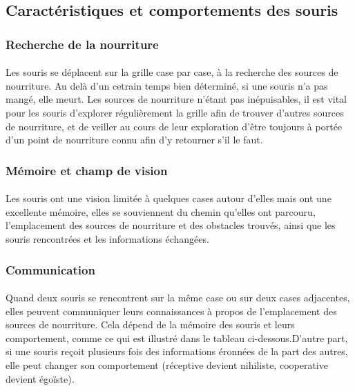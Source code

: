\subsection{Caractéristiques et comportements des souris}
\label{sec:caractéristiques}

\subsubsection{Recherche de la nourriture}
\paragraph{} Les souris se déplacent sur la grille case par case, à la recherche des sources de nourriture. Au delà d'un cetrain temps bien déterminé, si une souris n'a pas mangé, elle meurt. Les sources de nourriture n'étant pas inépuisables, il est vital pour les souris d'explorer régulièrement la grille afin de trouver d'autres sources de nourriture, et de veiller au cours de leur exploration d'être toujours à portée d'un point de nourriture connu afin d'y retourner s'il le faut.

\subsubsection{Mémoire et champ de vision}
\paragraph{} Les souris ont une vision limitée à quelques cases autour d’elles mais ont une excellente mémoire, elles se souviennent du chemin qu’elles ont parcouru, l’emplacement des sources de nourriture et des obstacles trouvés, ainsi que les souris rencontrées et les informations échangées.

\subsubsection{Communication}
\paragraph{} Quand deux souris se rencontrent sur la même case ou sur deux cases adjacentes, elles peuvent communiquer leurs connaissances à propos de l'emplacement des sources de nourriture. Cela dépend de la mémoire des souris et leurs comportement, comme ce qui est illustré dans le tableau ci-dessous.D'autre part, si une souris reçoit plusieurs fois des informations éronnées de la part des autres, elle peut changer son comportement (réceptive devient nihiliste, cooperative devient égoïste).

